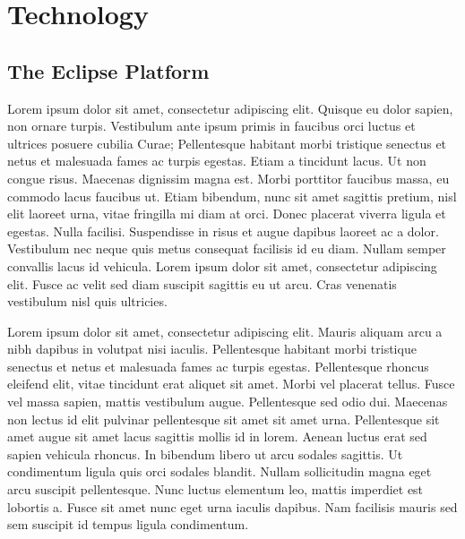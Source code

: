 \chapter{Technology}
\label{chap:technology}


\section{The Eclipse Platform}

Lorem ipsum dolor sit amet, consectetur adipiscing elit. Quisque eu dolor sapien, non ornare turpis. Vestibulum ante ipsum primis in faucibus orci luctus et ultrices posuere cubilia Curae; Pellentesque habitant morbi tristique senectus et netus et malesuada fames ac turpis egestas. Etiam a tincidunt lacus. Ut non congue risus. Maecenas dignissim magna est. Morbi porttitor faucibus massa, eu commodo lacus faucibus ut. Etiam bibendum, nunc sit amet sagittis pretium, nisl elit laoreet urna, vitae fringilla mi diam at orci. Donec placerat viverra ligula et egestas. Nulla facilisi. Suspendisse in risus et augue dapibus laoreet ac a dolor. Vestibulum nec neque quis metus consequat facilisis id eu diam. Nullam semper convallis lacus id vehicula. Lorem ipsum dolor sit amet, consectetur adipiscing elit. Fusce ac velit sed diam suscipit sagittis eu ut arcu. Cras venenatis vestibulum nisl quis ultricies.

Lorem ipsum dolor sit amet, consectetur adipiscing elit. Mauris aliquam arcu a nibh dapibus in volutpat nisi iaculis. Pellentesque habitant morbi tristique senectus et netus et malesuada fames ac turpis egestas. Pellentesque rhoncus eleifend elit, vitae tincidunt erat aliquet sit amet. Morbi vel placerat tellus. Fusce vel massa sapien, mattis vestibulum augue. Pellentesque sed odio dui. Maecenas non lectus id elit pulvinar pellentesque sit amet sit amet urna. Pellentesque sit amet augue sit amet lacus sagittis mollis id in lorem. Aenean luctus erat sed sapien vehicula rhoncus. In bibendum libero ut arcu sodales sagittis. Ut condimentum ligula quis orci sodales blandit. Nullam sollicitudin magna eget arcu suscipit pellentesque. Nunc luctus elementum leo, mattis imperdiet est lobortis a. Fusce sit amet nunc eget urna iaculis dapibus. Nam facilisis mauris sed sem suscipit id tempus ligula condimentum.




